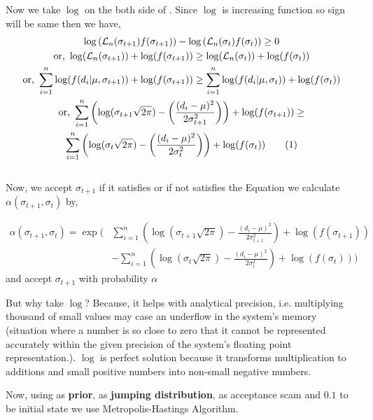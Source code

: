 \begin{example}
	Now we take $ \log $ on the both side of . Since $ \log $ is increasing function so sign will be same then we have,
	\begin{gather*}
		\log \left(  \mathcal{L}_n(\sigma_{t+1})f(\sigma_{t+1}) \right) - \log \left(  \mathcal{L}_n(\sigma_{t})f(\sigma_{t})\right) \ge 0 \\
		\text{or, } \log( \mathcal{L}_n(\sigma_{t+1}) ) + \log(f(\sigma_{t+1})) \ge \log(\mathcal{L}_n(\sigma_t)) + \log(f(\sigma_t)) \\
		\text{or, } \sum_{i=1}^n \log(f(d_i|\mu,\sigma_{t+1})) + \log(f(\sigma_{t+1}))  \ge \sum_{i = 1}^{n} \log(f(d_i|\mu,\sigma_t)) + \log (f(\sigma_t))\\
		\text{or, } \sum_{i = 1}^{n} \left( \log(\sigma_{t+1}\sqrt{2 \pi}) - \left( \frac{(d_i - \mu)^2}{2 \sigma_{t+1}^2} \right) \right) + \log(f(\sigma_{t+1})) \ge \\ \sum_{i = 1}^{n} \left( \log(\sigma_{t}\sqrt{2 \pi}) - \left( \frac{(d_i - \mu)^2}{2 \sigma_{t}^2} \right) \right) + \log(f(\sigma_{t})) \label{eq:2nd accept mh example2} \numberthis
	\end{gather*} \\
	Now, we accept $ \sigma_{t+1} $ if it satisfies  or if not satisfies the Equation we calculate $ \alpha(\sigma_{t+1},\sigma_t) $ by,

	\begin{align*}
		\alpha(\sigma_{t+1}, \sigma_t) = \exp \bigg( & \sum_{i=1}^{n} \left( \log(\sigma_{t+1} \sqrt{2 \pi}) - \frac{(d_i - \mu)^2}{2 \sigma_{t+1}^2} \right) + \log(f(\sigma_{t+1})) \\
		                                             & - \sum_{i=1}^{n} \left( \log(\sigma_t \sqrt{2 \pi}) - \frac{(d_i - \mu)^2}{2 \sigma_t^2} \right) + \log(f(\sigma_t)) \bigg)
	\end{align*}
	and accept $ \sigma_{t+1} $ with probability $ \alpha $

	But why take $ \log $? Because, it helps with analytical precision, i.e. multiplying thousand of small values may case an underflow in the system's memory (situation where a number is so close to zero that it cannot be represented accurately within the given precision of the system's floating point representation.). $ \log $ is perfect solution because it transforms multiplication to additions and small positive numbers into non-small negative numbers.

	Now, using  as \textbf{prior},  as \textbf{jumping distribution},  as acceptance scam and $0.1$ to be initial state we use Metropolis-Hastings Algorithm.


\end{example}
